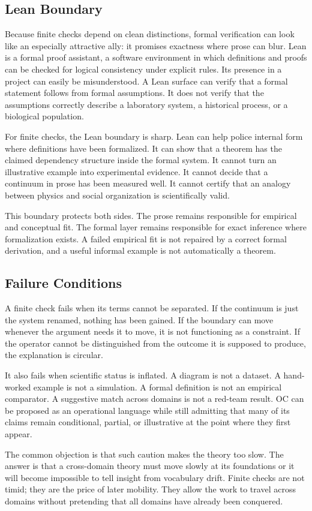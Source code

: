 \documentclass[11pt,a4paper,openany]{book}
\begin{document}
\subsection{Lean Boundary}
Because finite checks depend on clean distinctions, formal verification can look like an especially attractive ally: it promises exactness where prose can blur. Lean is a formal proof assistant, a software environment in which definitions and proofs can be checked for logical consistency under explicit rules. Its presence in a project can easily be misunderstood. A Lean surface can verify that a formal statement follows from formal assumptions. It does not verify that the assumptions correctly describe a laboratory system, a historical process, or a biological population. \cite{kadanoff_scaling,wilson_renormalization}\par
For finite checks, the Lean boundary is sharp. Lean can help police internal form where definitions have been formalized. It can show that a theorem has the claimed dependency structure inside the formal system. It cannot turn an illustrative example into experimental evidence. It cannot decide that a continuum in prose has been measured well. It cannot certify that an analogy between physics and social organization is scientifically valid.\par
This boundary protects both sides. The prose remains responsible for empirical and conceptual fit. The formal layer remains responsible for exact inference where formalization exists. A failed empirical fit is not repaired by a correct formal derivation, and a useful informal example is not automatically a theorem.\par
\subsection{Failure Conditions}
A finite check fails when its terms cannot be separated. If the continuum is just the system renamed, nothing has been gained. If the boundary can move whenever the argument needs it to move, it is not functioning as a constraint. If the operator cannot be distinguished from the outcome it is supposed to produce, the explanation is circular. \cite{kadanoff_scaling,wilson_renormalization}\par
It also fails when scientific status is inflated. A diagram is not a dataset. A hand-worked example is not a simulation. A formal definition is not an empirical comparator. A suggestive match across domains is not a red-team result. OC can be proposed as an operational language while still admitting that many of its claims remain conditional, partial, or illustrative at the point where they first appear.\par
The common objection is that such caution makes the theory too slow. The answer is that a cross-domain theory must move slowly at its foundations or it will become impossible to tell insight from vocabulary drift. Finite checks are not timid; they are the price of later mobility. They allow the work to travel across domains without pretending that all domains have already been conquered.\par
\end{document}
